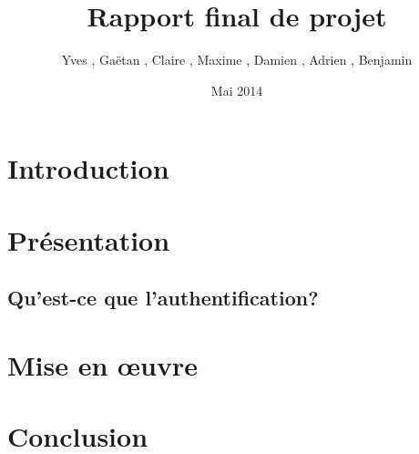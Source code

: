 \documentclass{"../../res/univ-projet-rapport"}
\title{Rapport final de projet}
\author{Yves \bsc{Adegoloye}, Gaëtan \bsc{Ferry}, Claire \bsc{Hardouin}, Maxime \bsc{Michotte}, Damien \bsc{Picard}, Adrien \bsc{Smondack}, Benjamin \bsc{Zigh}}
\date{Mai 2014}
\begin{document}
\maketitle
\tableofcontents
\newpage

\chapter{Introduction}


\chapter{Présentation}

\section{Qu'est-ce que l'authentification?}




\chapter{Mise en œuvre}



\chapter{Conclusion}
\end{document}
